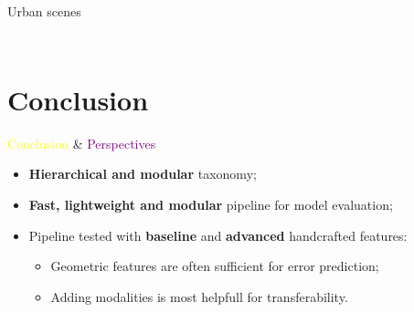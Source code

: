 \documentclass[12pt]{beamer}
\begin{document}
\begin{frame}{Urban scenes}
{\begin{columns}[T]
\begin{column}{.48\textwidth}
\begin{overlayarea}{\textwidth}{.8\textheight}
{                                }
                            \end{overlayarea}
                        \end{column}
                    \end{columns}
                }
            \end{frame}

        
    \section{Conclusion}
        \begin{frame}{\textcolor{yellow}{Conclusion} \& \textcolor{purple}{Perspectives}}
            \begin{itemize}[label=\(\blacktriangleright\), font=\color{yellow}, itemsep=2em]
                \item<1-> \textbf{Hierarchical and modular} taxonomy;
                \item<2-> \textbf{Fast, lightweight and modular} pipeline for model evaluation;
                \item<3-> Pipeline tested with \textbf{baseline} and \textbf{advanced} handcrafted features:
                    \begin{itemize}[label=\(\blacktriangleright\), font=\color{IGNGreen}]
                        \item<4-> Geometric features are often sufficient for error prediction;
                        \item<5-> Adding modalities is most helpfull for transferability.
                    \end{itemize}
            \end{itemize}
        \end{frame}
\end{document}
